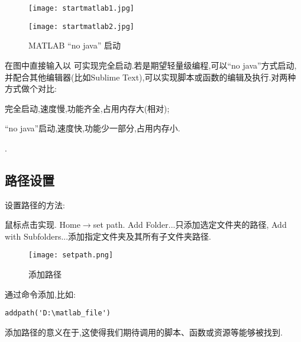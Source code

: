 \begin{figure}[htbp]
  \centering
  \texttt{[image: startmatlab1.jpg]}
\end{figure}

\begin{figure}[htbp]
  \centering
  \texttt{[image: startmatlab2.jpg]}
  \caption{MATLAB “no java” 启动}
\end{figure}

在图中直接输入以  可实现完全启动.若是期望轻量级编程,可以“no java”方式启动,并配合其他编辑器(比如Sublime Text),可以实现脚本或函数的编辑及执行.对两种方式做个对比:

\begindot
  \item 完全启动,速度慢,功能齐全,占用内存大(相对);
  \item “no java”启动,速度快,功能少一部分,占用内存小.
\myenddot

.


\subsection{路径设置}
设置路径的方法:
\begindot
  \item 鼠标点击实现. Home$\rightarrow$set path. Add Folder...只添加选定文件夹的路径, Add with Subfolders...添加指定文件夹及其所有子文件夹路径.

    \begin{figure}[htbp]
      \centering
      \texttt{[image: setpath.png]}
      \caption{添加路径}
    \end{figure}

  \item 通过命令添加,比如:

    \vspace{-0.8cm}
    \begin{lstlisting}[caption = 添加路径]
      addpath('D:\matlab_file')
    \end{lstlisting}

\myenddot
添加路径的意义在于,这使得我们期待调用的脚本、函数或资源等能够被找到.




